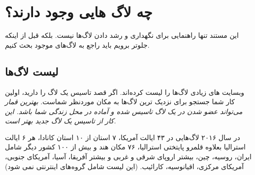 \section{چه لاگ هایی وجود دارند؟}

این مستند تنها راهنمایی برای نگهداری و رشد دادن لاگ‌ها نیست.
بلکه قبل از اینکه جلوتر برویم باید راجع به لاگ‌های موجود بحث کنیم.

\subsection{لیست لاگ‌ها}

وبسایت های زیادی لاگ‌ها را لیست کرده‌اند. اگر قصد تاسیس یک لاگ را دارید،
اولین کار شما جستجو برای نزدیک ترین لاگ‌ها به مکان موردنظر شماست.
{\itshape
بهترین قمار می‌تواند عضو شدن در یک لاگ تاسیس شده و آماده در محل زندگی شما باشد.
این کار از تاسیس یک لاگ جدید بهتر است.
}

در سال ۲۰۱۶ لاگ‌هایی در ۴۳ ایالت آمریکا، ۷ استان از ۱۰ استان کانادا،
هر ۶ ایالت استرالیا بعلاوه قلمرو پایتختی استرالیا، ۷۶ مکان هند و
بیش از ۱۰۰ کشور دیگر شامل ایران، روسیه، چین، بیشتر اروپای شرقی و غربی
و بیشتر آفریقا، آسیا، آمریکای جنوبی، آمریکای مرکزی، اقیانوسیه، کارائیب.
(این لیست شامل گروه‌های اینترنتی
نمی ‌شود)

